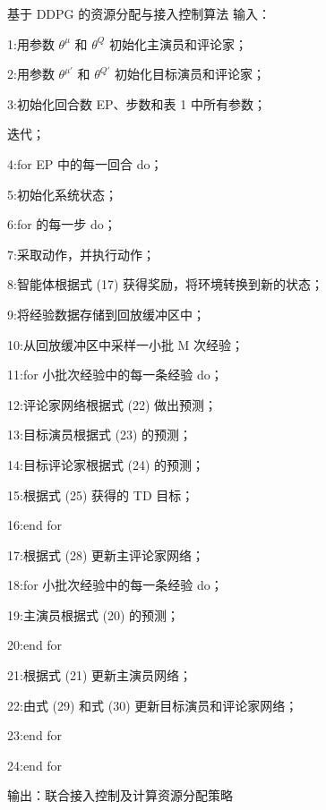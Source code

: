 \begin{simplealgo}{基于 DDPG 的资源分配与接入控制算法}
输入：\par
1:\quad 用参数 $\theta^{\mu}$ 和 $\theta^{Q}$ 初始化主演员和评论家；\par
2:\quad 用参数 $\theta^{\mu'}$ 和 $\theta^{Q'}$ 初始化目标演员和评论家；\par
3:\quad 初始化回合数 EP、步数和表 1 中所有参数；\par
迭代；\par
4:\quad for EP 中的每一回合 do；\par
5:\qquad 初始化系统状态；\par
6:\qquad for 的每一步 do；\par
7:\qquad\quad 采取动作，并执行动作；\par
8:\qquad\quad 智能体根据式 (17) 获得奖励，将环境转换到新的状态；\par
9:\qquad\quad 将经验数据存储到回放缓冲区中；\par
10:\qquad\quad 从回放缓冲区中采样一小批 M 次经验；\par
11:\qquad\quad for 小批次经验中的每一条经验 do；\par
12:\qquad\qquad 评论家网络根据式 (22) 做出预测；\par
13:\qquad\qquad 目标演员根据式 (23) 的预测；\par
14:\qquad\qquad 目标评论家根据式 (24) 的预测；\par
15:\qquad\qquad 根据式 (25) 获得的 TD 目标；\par
16:\qquad\quad end for\par
17:\qquad\quad 根据式 (28) 更新主评论家网络；\par
18:\qquad\quad for 小批次经验中的每一条经验 do；\par
19:\qquad\qquad 主演员根据式 (20) 的预测；\par
20:\qquad\quad end for\par
21:\qquad\quad 根据式 (21) 更新主演员网络；\par
22:\qquad\quad 由式 (29) 和式 (30) 更新目标演员和评论家网络；\par
23:\quad end for\par
24:\quad end for\par
输出：联合接入控制及计算资源分配策略
\end{simplealgo}
